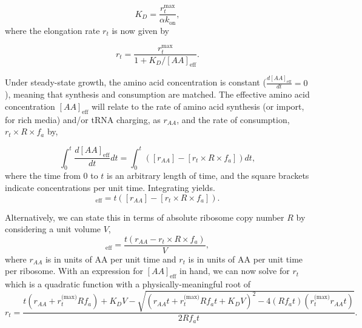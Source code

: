 \begin{equation}
    K_D = \frac{r_{t}^{\text{max}}}{\alpha k_\text{on}},
\end{equation}
where the elongation rate $r_t$ is now given by

\begin{equation}
r_t = \frac{r_{t}^{\text{max}}}{1 + K_D/[AA]_{\text{eff}}}.
\label{eq:rt_kd_simple}
\end{equation}

Under steady-state growth, the amino acid concentration is constant
($\frac{d[AA]_\text{eff}}{dt}=0$), meaning that synthesis and consumption are matched.
The effective amino acid concentration $[AA]_{\text{eff}}$ will relate to the rate of
amino acid synthesis (or import, for rich media) and/or tRNA charging,
as $r_{AA}$,  and the rate of consumption,
$r_t\times R \times f_a$ by,

\begin{equation}
\int_{0}^{t} \frac{d[AA]_{\text{eff}}}{dt} dt =  \int_{0}^{t}([r_{AA}] - [r_t\times R \times f_a]) dt,
\label{eq:aaeff_int}
\end{equation}
where the time from 0 to $t$ is an arbitrary length of time, and the square
brackets indicate concentrations per unit time.
Integrating  yields.
\begin{equation}
[AA]_{\text{eff}} =  t([r_{AA}] - [r_t \times R \times f_a]).
\label{eq:aaeff_concs}
\end{equation}

Alternatively, we can state this in terms of absolute ribosome copy number $R$
by considering a unit volume $V$,
\begin{equation}
   [AA]_\text{eff} = \frac{t(r_{AA} - r_t \times R \times f_a)}{V},
   \label{eq:aa_final}
\end{equation}
where $r_{AA}$ is in units of AA per unit time and $r_t$ is in units of AA per
unit time per ribosome. With an expression for $[AA]_\text{eff}$ in hand, we can now solve
 for $r_t$ which is a quadratic function with a
physically-meaningful root of
\begin{equation}
r_t = \frac{t(r_{AA} + r_t^\text{(max)}Rf_a) + K_D V - \sqrt{(r_{AA}t + r_t^\text{(max)}Rf_at + K_D V)^2 - 4(Rf_at)(r_t^\text{(max)}r_{AA} t)}}{2Rf_at}.
\label{eq:rt_root}
\end{equation}

